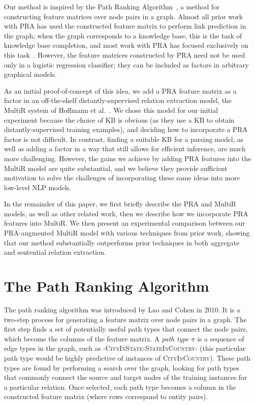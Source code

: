 \documentclass[11pt,a4paper]{article}
\newcommand{\relation}[1]{\textsc{#1}}
\newcommand{\pathtype}{\ensuremath{\pi}}
\begin{document}
Our method is inspired by the Path Ranking Algorithm~\cite[PRA]{lao-2010-pra},
a method for constructing feature matrices over node pairs in a graph.  Almost
all prior work with PRA has used the constructed feature matrix to perform link
prediction in the graph; when the graph corresponds to a knowledge base, this
is the task of knowledge base completion, and most work with PRA has focused
exclusively on this task~\cite{lao-2011-pra2,lao-2012-syntactic-pra,%
dong-2014-knowledge-vault,gardner-2013-latent-pra,gardner-2014-vector-space-pra}.
However, the feature matrices constructed by PRA need not be used only in a
logistic regression classifier; they can be included as factors in arbitrary
graphical models.

As an initial proof-of-concept of this idea, we add a PRA feature matrix as a
factor in an off-the-shelf distantly-supervised relation extraction model, the
MultiR system of Hoffmann et al.~.
We chose this model for our initial experiment because the choice of KB is
obvious (as they use a KB to obtain distantly-supervised training examples),
and deciding how to incorporate a PRA factor is not difficult.  In contrast,
finding a suitable KB for a parsing model, as well as adding a factor in a way
that still allows for efficient inference, are much more challenging.  However,
the gains we achieve by adding PRA features into the MultiR model are quite
substantial, and we believe they provide sufficient motivation to solve the
challenges of incorporating these same ideas into more low-level NLP models.

In the remainder of this paper, we first briefly describe the PRA and MultiR
models, as well as other related work, then we describe how we incorporate PRA
features into MultiR.  We then present an experimental comparison between our
PRA-augmented MultiR model with various techniques from prior work, showing
that our method substantially outperforms prior techniques in both aggregate
and sentential relation extraction.

\section{The Path Ranking Algorithm}

The path ranking algorithm was introduced by Lao and Cohen in 2010.  It is a
two-step process for generating a feature matrix over node pairs in a graph.
The first step finds a set of potentially useful path types that connect the
node pairs, which become the columns of the feature matrix.  A \emph{path type}
\pathtype{} is a sequence of edge types in the graph, such as
-\relation{CityInState}-\relation{StateInCountry}- (this particular path type
would be highly predictive of instances of \relation{CityInCountry}).  These
path types are found by performing a search over the graph, looking for path
types that commonly connect the source and target nodes of the training
instances for a particular relation.  Once selected, each path type becomes a
column in the constructed feature matrix (where rows correspond to entity
pairs).
\end{document}
